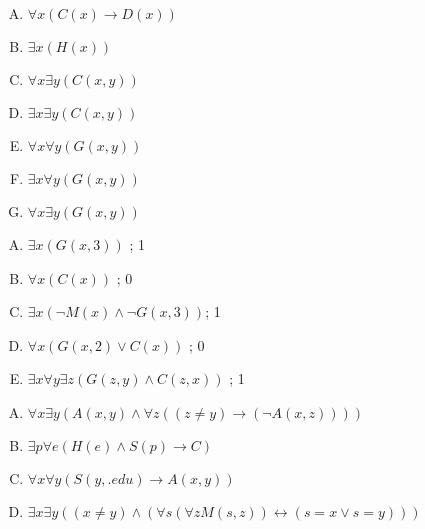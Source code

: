 {{        %
        \begin{practices}
            \begin{enumerate}[A.]
                \item $\forall x (C(x) \rightarrow D(x))$
                \item $\exists x (H(x))$
                \item $\forall x \exists y (C(x, y))$
                \item $\exists x \exists y (C(x, y))$
                \item $\forall x \forall y (G(x, y))$
                \item $\exists x \forall y (G(x, y))$
                \item $\forall x \exists y (G(x, y))$
            \end{enumerate}
        \end{practices}

        \begin{practices}
            \begin{enumerate}[A.]
                \item $\exists x (G(x, 3))$ ; 1
                \item $\forall x (C(x))$ ; 0
                \item $\exists x (\neg M(x) \wedge \neg G(x, 3))$; 1
                \item $\forall x (G(x, 2) \vee C(x))$ ; 0
                \item $\exists x \forall y \exists z (G(z, y) \wedge C(z, x))$ ; 1
            \end{enumerate}
        \end{practices}

        \begin{practices}
            \begin{enumerate}[A.]
                \item $\forall x \exists y (A(x, y) \wedge \forall z ((z \neq y) \rightarrow (\neg A(x, z))))$
                \item $\exists p \forall e (H(e) \wedge S(p) \rightarrow C)$
                \item $\forall x \forall y (S(y, .edu) \rightarrow A(x, y))$
                \item $\exists x \exists y ((x \neq y) \wedge (\forall s(\forall z M(s, z)) \leftrightarrow (s = x \vee s = y)))$
            \end{enumerate}
        \end{practices}

}}
